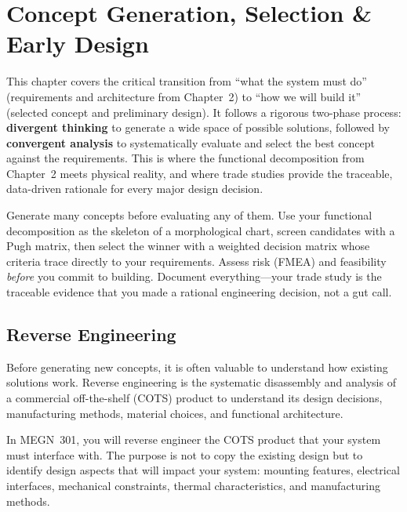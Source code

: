 \documentclass[11pt,letterpaper,twoside,openany]{book}
\begin{document}
\FloatBarrier
\chapter{Concept Generation, Selection \& Early Design}

\vspace{1em}

This chapter covers the critical transition from ``what the system must do'' (requirements and architecture from Chapter~2) to ``how we will build it'' (selected concept and preliminary design). It follows a rigorous two-phase process: \textbf{divergent thinking} to generate a wide space of possible solutions, followed by \textbf{convergent analysis} to systematically evaluate and select the best concept against the requirements. This is where the functional decomposition from Chapter~2 meets physical reality, and where trade studies provide the traceable, data-driven rationale for every major design decision.

\begin{keyconceptbox}
Generate many concepts before evaluating any of them. Use your functional decomposition as the skeleton of a morphological chart, screen candidates with a Pugh matrix, then select the winner with a weighted decision matrix whose criteria trace directly to your requirements. Assess risk (FMEA) and feasibility \emph{before} you commit to building. Document everything---your trade study is the traceable evidence that you made a rational engineering decision, not a gut call.
\end{keyconceptbox}

\vspace{1em}

\FloatBarrier
\section{Reverse Engineering}
Before generating new concepts, it is often valuable to understand how existing solutions work. Reverse engineering is the systematic disassembly and analysis of a commercial off-the-shelf (COTS) product to understand its design decisions, manufacturing methods, material choices, and functional architecture.

In MEGN~301, you will reverse engineer the COTS product that your system must interface with. The purpose is not to copy the existing design but to identify design aspects that will impact your system: mounting features, electrical interfaces, mechanical constraints, thermal characteristics, and manufacturing methods.
\end{document}

